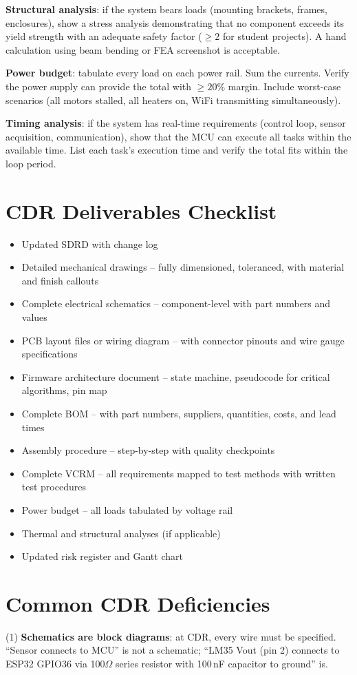 \documentclass[11pt,letterpaper,twoside,openany]{book}
\begin{document}
\textbf{Structural analysis}: if the system bears loads (mounting brackets, frames, enclosures), show a stress analysis demonstrating that no component exceeds its yield strength with an adequate safety factor ($\geq 2$ for student projects). A hand calculation using beam bending or FEA screenshot is acceptable.

\textbf{Power budget}: tabulate every load on each power rail. Sum the currents. Verify the power supply can provide the total with $\geq 20\%$ margin. Include worst-case scenarios (all motors stalled, all heaters on, WiFi transmitting simultaneously).

\textbf{Timing analysis}: if the system has real-time requirements (control loop, sensor acquisition, communication), show that the MCU can execute all tasks within the available time. List each task's execution time and verify the total fits within the loop period.

\section{CDR Deliverables Checklist}
\begin{itemize}[nosep,leftmargin=1.5em]
\item Updated SDRD with change log
\item Detailed mechanical drawings -- fully dimensioned, toleranced, with material and finish callouts
\item Complete electrical schematics -- component-level with part numbers and values
\item PCB layout files or wiring diagram -- with connector pinouts and wire gauge specifications
\item Firmware architecture document -- state machine, pseudocode for critical algorithms, pin map
\item Complete BOM -- with part numbers, suppliers, quantities, costs, and lead times
\item Assembly procedure -- step-by-step with quality checkpoints
\item Complete VCRM -- all requirements mapped to test methods with written test procedures
\item Power budget -- all loads tabulated by voltage rail
\item Thermal and structural analyses (if applicable)
\item Updated risk register and Gantt chart
\end{itemize}

\section{Common CDR Deficiencies}
(1) \textbf{Schematics are block diagrams}: at CDR, every wire must be specified. ``Sensor connects to MCU'' is not a schematic; ``LM35 Vout (pin 2) connects to ESP32 GPIO36 via 100$\Omega$ series resistor with 100\,nF capacitor to ground'' is.
\end{document}
